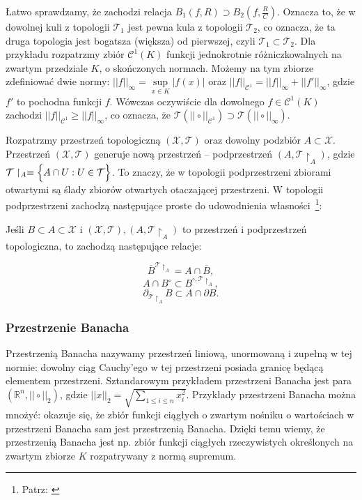 Łatwo sprawdzamy, że zachodzi relacja $ B_1(f,R) \supset B_2 (f, \frac{R}{C})$. Oznacza to, że w dowolnej kuli z topologii $ \mathcal{T}_1 $ jest pewna kula z topologii $ \mathcal{T}_2 $, co oznacza, że ta druga topologia jest bogatsza (większa) od pierwszej, czyli $ \mathcal{T}_1 \subset	\mathcal{T}_2 $. Dla przykładu rozpatrzmy zbiór $ \mathcal{C}^{1}(K) $ funkcji jednokrotnie różniczkowalnych na zwartym przedziale $ K $, o skończonych normach. Możemy na tym zbiorze zdefiniować dwie normy: $ ||f||_{\infty} = \underset{x \in K}{\sup} |f(x)| $ oraz $ || f ||_{\mathcal{C}^1} = ||f||_{\infty} + ||f'||_{\infty}$, gdzie $ f' $ to pochodna funkcji $ f $. Wówczas oczywiście dla dowolnego $ f \in \mathcal{C}^{1}(K) $ zachodzi $ || f ||_{\mathcal{C}^1} \geq ||f||_{\infty}  $, co oznacza, że $ \mathcal{T}(||\circ||_{\mathcal{C}^1}) \supset \mathcal{T}(||\circ||_{\infty}) $.

Rozpatrzmy przestrzeń topologiczną $ (\mathcal{X}, \mathcal{T}) $ oraz dowolny podzbiór $ A \subset \mathcal{X} $. Przestrzeń $ (\mathcal{X}, \mathcal{T}) $ generuje nową przestrzeń -- podprzestrzeń $(A, \mathcal{T}\restriction_A )$, gdzie $ \mathcal{T}\restriction_A  \equiv \Bigl\{	A \cap U : U \in \mathcal{T} \Bigl\}$. To znaczy, że w topologii podprzestrzeni zbiorami otwartymi są ślady zbiorów otwartych otaczającej przestrzeni. W topologii podprzestrzeni zachodzą następujące proste do udowodnienia własności~\footnote{Patrz: \citet[][str. 77-78]{Dugundji}}: 
\begin{lemat}
	Jeśli $ B \subset A \subset \mathcal{X} $ i $ (\mathcal{X}, \mathcal{T}), (A, \mathcal{T}\restriction_A)$ to przestrzeń i podprzestrzeń topologiczna, to zachodzą następujące relacje:
	
$$ \overline{B}^{\mathcal{T}\restriction_A} = A \cap \overline{B} ,$$
$$ A \cap B^{\circ} \subset B^{\circ, \mathcal{T}\restriction_A},$$
$$ \partial_{\mathcal{T}\restriction_A} B \subset A \cap \partial{B}.	$$
\end{lemat}

\subsubsection*{Przestrzenie Banacha}

	Przestrzenią Banacha nazywamy przestrzeń liniową, unormowaną i zupełną w tej normie: dowolny ciąg Cauchy'ego w tej przestrzeni posiada granicę będącą elementem przestrzeni. Sztandarowym przykładem przestrzeni Banacha jest para $(\mathbb{R}^n, ||\circ||_2)$, gdzie $||x||_2 = \sqrt{\underset{1\leq i \leq n}{\sum}  x_i^2}$. Przykłady przestrzeni Banacha można mnożyć: okazuje się, że zbiór funkcji ciągłych o zwartym nośniku o wartościach w przestrzeni Banacha sam jest przestrzenią Banacha. Dzięki temu wiemy, że przestrzenią Banacha jest np. zbiór funkcji ciągłych rzeczywistych określonych na zwartym zbiorze $K$ rozpatrywany z normą supremum. 

